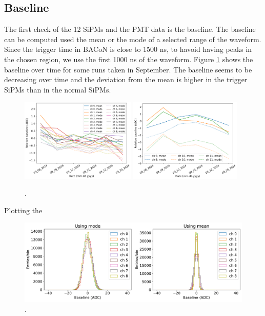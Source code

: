 \documentclass[11pt,a4paper,english,oneside, pdf]{article}
\begin{document}
	
	
	
	\subsection{Baseline}
	
	
	The first check of the 12 SiPMs and the PMT data is the baseline. The baseline can be computed used the mean or the mode of a selected range of the waveform. Since the trigger time in BACoN is close to 1500 ns, to havoid having peaks in the chosen region, we use the first 1000 ns of the waveform. Figure \ref{fig:baselines} shows the baseline over time for some runs taken in September. The baseline seems to be decreasing over time and the deviation from the mean is higher in the trigger SiPMs than in the normal SiPMs.
	
	\begin{figure}[!h]
		\begin{center}
			\includegraphics[width=0.49\textwidth]{images/baselines_rel1.pdf}
			\includegraphics[width=0.477\textwidth]{images/baselines_rel2.pdf}
			\caption{.}
			\label{fig:baselines}
			\end{center}
	\end{figure}
	
	Plotting the 
	
	\begin{figure}[!h]
		\begin{center}
			\includegraphics[width=\textwidth]{images/baselines_rel1_norm_ch.pdf}
			\caption{.}
			\label{fig:baselines2}
		\end{center}
	\end{figure}
\end{document}
